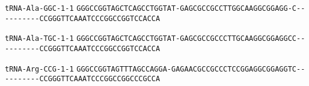 \documentclass{article}
\newcommand{\rnabox}[1]{\colorbox{#1}{\texttt{#1}}}
\begin{document}
\vspace{-0.5mm}

\texttt{tRNA-Ala-GGC-1-1}
\rnabox{G}\rnabox{G}\rnabox{G}\rnabox{C}\rnabox{C}\rnabox{G}\rnabox{G}\rnabox{T}\rnabox{A}\rnabox{G}\rnabox{C}\rnabox{T}\rnabox{C}\rnabox{A}\rnabox{G}\rnabox{C}\rnabox{C}\rnabox{T}\rnabox{G}\rnabox{G}\rnabox{T}\rnabox{A}\rnabox{T}\rnabox{-}\rnabox{G}\rnabox{A}\rnabox{G}\rnabox{C}\rnabox{G}\rnabox{C}\rnabox{C}\rnabox{G}\rnabox{C}\rnabox{C}\rnabox{T}\rnabox{T}\rnabox{G}\rnabox{G}\rnabox{C}\rnabox{A}\rnabox{A}\rnabox{G}\rnabox{G}\rnabox{C}\rnabox{G}\rnabox{G}\rnabox{A}\rnabox{G}\rnabox{G}\rnabox{-}\rnabox{C}\rnabox{-}\rnabox{-}\rnabox{-}\rnabox{-}\rnabox{-}\rnabox{-}\rnabox{-}\rnabox{-}\rnabox{-}\rnabox{-}\rnabox{C}\rnabox{C}\rnabox{G}\rnabox{G}\rnabox{G}\rnabox{T}\rnabox{T}\rnabox{C}\rnabox{A}\rnabox{A}\rnabox{A}\rnabox{T}\rnabox{C}\rnabox{C}\rnabox{C}\rnabox{G}\rnabox{G}\rnabox{C}\rnabox{C}\rnabox{G}\rnabox{G}\rnabox{T}\rnabox{C}\rnabox{C}\rnabox{A}\rnabox{C}\rnabox{C}\rnabox{A}

\vspace{-0.5mm}

\texttt{tRNA-Ala-TGC-1-1}
\rnabox{G}\rnabox{G}\rnabox{G}\rnabox{C}\rnabox{C}\rnabox{G}\rnabox{G}\rnabox{T}\rnabox{A}\rnabox{G}\rnabox{C}\rnabox{T}\rnabox{C}\rnabox{A}\rnabox{G}\rnabox{C}\rnabox{C}\rnabox{T}\rnabox{G}\rnabox{G}\rnabox{T}\rnabox{A}\rnabox{T}\rnabox{-}\rnabox{G}\rnabox{A}\rnabox{G}\rnabox{C}\rnabox{G}\rnabox{C}\rnabox{C}\rnabox{G}\rnabox{C}\rnabox{C}\rnabox{C}\rnabox{T}\rnabox{T}\rnabox{G}\rnabox{C}\rnabox{A}\rnabox{A}\rnabox{G}\rnabox{G}\rnabox{C}\rnabox{G}\rnabox{G}\rnabox{A}\rnabox{G}\rnabox{G}\rnabox{C}\rnabox{C}\rnabox{-}\rnabox{-}\rnabox{-}\rnabox{-}\rnabox{-}\rnabox{-}\rnabox{-}\rnabox{-}\rnabox{-}\rnabox{-}\rnabox{C}\rnabox{C}\rnabox{G}\rnabox{G}\rnabox{G}\rnabox{T}\rnabox{T}\rnabox{C}\rnabox{A}\rnabox{A}\rnabox{A}\rnabox{T}\rnabox{C}\rnabox{C}\rnabox{C}\rnabox{G}\rnabox{G}\rnabox{C}\rnabox{C}\rnabox{G}\rnabox{G}\rnabox{T}\rnabox{C}\rnabox{C}\rnabox{A}\rnabox{C}\rnabox{C}\rnabox{A}

\vspace{-0.5mm}

\texttt{tRNA-Arg-CCG-1-1}
\rnabox{G}\rnabox{G}\rnabox{G}\rnabox{C}\rnabox{C}\rnabox{G}\rnabox{G}\rnabox{T}\rnabox{A}\rnabox{G}\rnabox{T}\rnabox{T}\rnabox{T}\rnabox{A}\rnabox{G}\rnabox{C}\rnabox{C}\rnabox{A}\rnabox{G}\rnabox{G}\rnabox{A}\rnabox{-}\rnabox{G}\rnabox{A}\rnabox{G}\rnabox{A}\rnabox{A}\rnabox{C}\rnabox{G}\rnabox{C}\rnabox{C}\rnabox{G}\rnabox{C}\rnabox{C}\rnabox{C}\rnabox{T}\rnabox{C}\rnabox{C}\rnabox{G}\rnabox{G}\rnabox{A}\rnabox{G}\rnabox{G}\rnabox{C}\rnabox{G}\rnabox{G}\rnabox{A}\rnabox{G}\rnabox{G}\rnabox{T}\rnabox{C}\rnabox{-}\rnabox{-}\rnabox{-}\rnabox{-}\rnabox{-}\rnabox{-}\rnabox{-}\rnabox{-}\rnabox{-}\rnabox{-}\rnabox{C}\rnabox{C}\rnabox{G}\rnabox{G}\rnabox{G}\rnabox{T}\rnabox{T}\rnabox{C}\rnabox{A}\rnabox{A}\rnabox{A}\rnabox{T}\rnabox{C}\rnabox{C}\rnabox{C}\rnabox{G}\rnabox{G}\rnabox{C}\rnabox{C}\rnabox{G}\rnabox{G}\rnabox{C}\rnabox{C}\rnabox{C}\rnabox{G}\rnabox{C}\rnabox{C}\rnabox{A}
\end{document}
